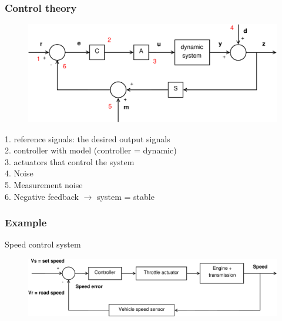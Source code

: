 \documentclass{beamer}
\begin{document}

\begin{frame}
\vspace{-4ex}
\frametitle{Control theory}
\begin{figure}
\includegraphics[width=1\linewidth]{full_system2}
\end{figure}
\vspace{-4ex}
1. reference signals: the desired output signals\\
2. controller with model (controller = dynamic)\\
3. actuators that control the system\\
4. Noise\\
5. Measurement noise\\
6. Negative feedback $\rightarrow$ system = stable 
\end{frame}


\begin{frame}
\frametitle{Example}
\vspace{-11ex}
Speed control system\\
\bigskip
\bigskip
\begin{figure}
\includegraphics[width=1\linewidth]{speed_control_system}
\end{figure}
\end{frame}

\end{document}

